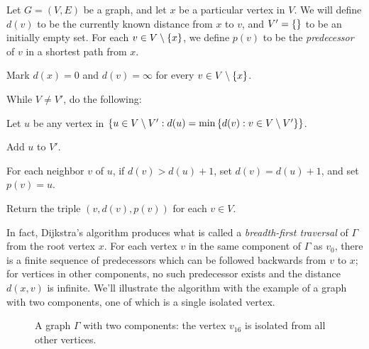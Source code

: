 \documentclass[m3380-lec-main.tex]{subfiles}
\begin{document}
\begin{alg}
Let $G=(V,E)$ be a graph, and let $x$ be a particular vertex in $V$. We will define $d(v)$ to be the currently known distance from $x$ to $v$, and $V'=\left\{\right\}$ to be an initially empty set. For each $v\in V\setminus\left\{x\right\}$, we define $p(v)$ to be the \emph{predecessor} of $v$ in a shortest path from $x$.
\begin{enum}
\item Mark $d(x)=0$ and $d(v)=\infty$ for every $v\in V\setminus\left\{x\right\}$.
\item While $V\neq V'$, do the following:
\begin{enuma}
\item Let $u$ be any vertex in $\left\{u\in V\setminus V': d(u)=\min\left\{d(v):v\in V\setminus V'\right\}\right\}$.
\item Add $u$ to $V'$.
\item For each neighbor $v$ of $u$, if $d(v)>d(u)+1$, set $d(v)=d(u)+1$, and set $p(v)=u$.
\end{enuma}
\item Return the triple $(v,d(v), p(v))$ for each $v\in V$.
\end{enum}
\end{alg}

In fact, Dijkstra's algorithm produces what is called a \emph{breadth-first traversal} of $\Gamma$ from the root vertex $x$. For each vertex $v$ in the same component of $\Gamma$ as $v_0$, there is a finite sequence of predecessors which can be followed backwards from $v$ to $x$; for vertices in other components, no such predecessor exists and the distance $d(x,v)$ is infinite. We'll illustrate the algorithm with the example of a graph with two components, one of which is a single isolated vertex.

\begin{figure}[hbt]
\begin{center}{\footnotesize{}
}\end{center}
\caption{\label{fig:dijkstra_exmp}A graph $\Gamma$ with two components: the vertex $v_{16}$ is isolated from all other vertices.}
\end{figure}
\end{document}
